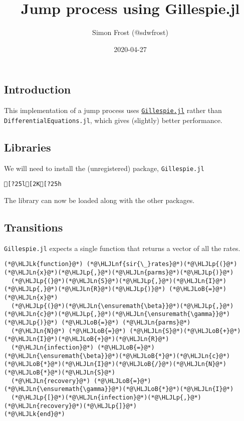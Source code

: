 \documentclass[12pt,a4paper]{article}
\title{ Jump process using Gillespie.jl }
\author{ Simon Frost (@sdwfrost) }
\date{ 2020-04-27 }
\newcommand{\HLJLk}[1]{\textcolor[RGB]{148,91,176}{\textbf{#1}}}
\newcommand{\HLJLn}[1]{#1}
\newcommand{\HLJLnf}[1]{\textcolor[RGB]{66,102,213}{#1}}
\newcommand{\HLJLoB}[1]{\textcolor[RGB]{102,102,102}{\textbf{#1}}}
\newcommand{\HLJLp}[1]{#1}
\begin{document}
\maketitle

\subsection{Introduction}
This implementation of a jump process uses \href{https://github.com/sdwfrost/Gillespie.jl}{\texttt{Gillespie.jl}} rather than \texttt{DifferentialEquations.jl}, which gives (slightly) better performance.

\subsection{Libraries}
We will need to install the (unregistered) package, \texttt{Gillespie.jl}


\begin{lstlisting}
[?25l[2K[?25h
\end{lstlisting}


The library can now be loaded along with the other packages.



\subsection{Transitions}
\texttt{Gillespie.jl} expects a single function that returns a vector of all the rates.


\begin{lstlisting}
(*@\HLJLk{function}@*) (*@\HLJLnf{sir{\_}rates}@*)(*@\HLJLp{(}@*)(*@\HLJLn{x}@*)(*@\HLJLp{,}@*)(*@\HLJLn{parms}@*)(*@\HLJLp{)}@*)
  (*@\HLJLp{(}@*)(*@\HLJLn{S}@*)(*@\HLJLp{,}@*)(*@\HLJLn{I}@*)(*@\HLJLp{,}@*)(*@\HLJLn{R}@*)(*@\HLJLp{)}@*) (*@\HLJLoB{=}@*) (*@\HLJLn{x}@*)
  (*@\HLJLp{(}@*)(*@\HLJLn{\ensuremath{\beta}}@*)(*@\HLJLp{,}@*)(*@\HLJLn{c}@*)(*@\HLJLp{,}@*)(*@\HLJLn{\ensuremath{\gamma}}@*)(*@\HLJLp{)}@*) (*@\HLJLoB{=}@*) (*@\HLJLn{parms}@*)
  (*@\HLJLn{N}@*) (*@\HLJLoB{=}@*) (*@\HLJLn{S}@*)(*@\HLJLoB{+}@*)(*@\HLJLn{I}@*)(*@\HLJLoB{+}@*)(*@\HLJLn{R}@*)
  (*@\HLJLn{infection}@*) (*@\HLJLoB{=}@*) (*@\HLJLn{\ensuremath{\beta}}@*)(*@\HLJLoB{*}@*)(*@\HLJLn{c}@*)(*@\HLJLoB{*}@*)(*@\HLJLn{I}@*)(*@\HLJLoB{/}@*)(*@\HLJLn{N}@*)(*@\HLJLoB{*}@*)(*@\HLJLn{S}@*)
  (*@\HLJLn{recovery}@*) (*@\HLJLoB{=}@*) (*@\HLJLn{\ensuremath{\gamma}}@*)(*@\HLJLoB{*}@*)(*@\HLJLn{I}@*)
  (*@\HLJLp{[}@*)(*@\HLJLn{infection}@*)(*@\HLJLp{,}@*)(*@\HLJLn{recovery}@*)(*@\HLJLp{]}@*)
(*@\HLJLk{end}@*)
\end{lstlisting}
\end{document}
